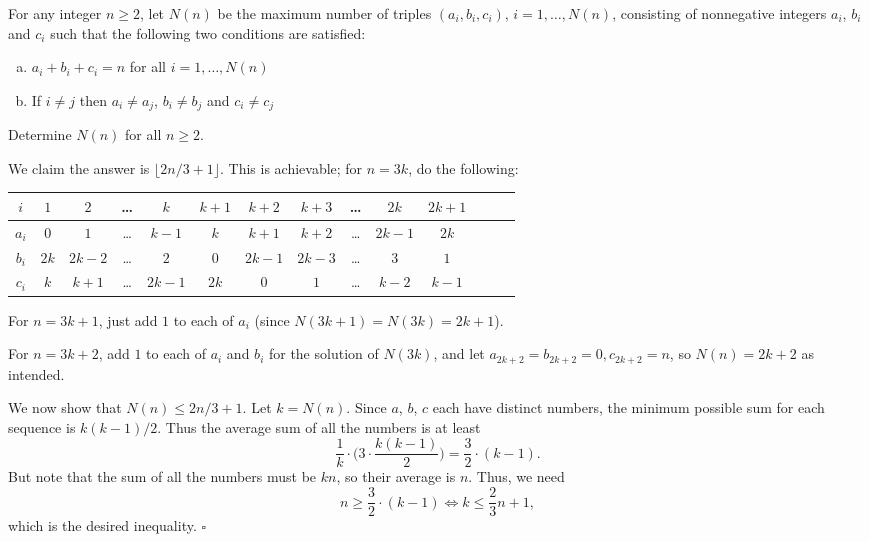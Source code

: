 
\begin{problem}[ISL 2009 C2]
    For any integer $n\geq 2$, let $N(n)$ be the maximum number of triples
    $(a_i, b_i, c_i)$, $i=1, \ldots, N(n)$, consisting of nonnegative integers
    $a_i$, $b_i$ and $c_i$ such that the following two conditions are satisfied: \begin{enumerate}[(a)]
        \item $a_i+b_i+c_i=n$ for all $i=1, \ldots, N(n)$
        \item If $i\neq j$ then $a_i\neq a_j$, $b_i\neq b_j$ and $c_i\neq c_j$
    \end{enumerate}
    Determine $N(n)$ for all $n\geq 2$.
\end{problem}

\begin{solution}
    We claim the answer is $\lfloor 2n/3 + 1 \rfloor$. This is achievable; for
    $n = 3k$, do the following:
    \begin{center}
    \begin{tabular}{c|c c c c c c c c c c c c c}
        $i$   & $1$ & $2$ & \ldots & $k$ & $k+1$ & $k+2$ & $k+3$ & \ldots & $2k$ & $2k+1$\\\hline
        $a_i$ & $0$ & $1$ & \ldots & $k-1$ & $k$ & $k+1$ & $k+2$ & \ldots & $2k-1$ & $2k$\\
        $b_i$ & $2k$ & $2k-2$ & \ldots & $2$ & $0$ & $2k-1$ & $2k-3$ & \ldots & $3$ & $1$\\
        $c_i$ & $k$ & $k+1$ & \ldots & $2k-1$ & $2k$ & $0$ & $1$ & \ldots & $k-2$ & $k-1$
    \end{tabular}
    \end{center}
    For $n = 3k+1$, just add $1$ to each of $a_i$ (since $N(3k+1) = N(3k) = 2k+1$).
    
    For $n = 3k+2$, add $1$ to each of $a_i$ and $b_i$ for the solution of $N(3k)$,
    and let $a_{2k+2} = b_{2k+2} = 0, c_{2k+2} = n$, so $N(n) = 2k+2$ as intended.
    
    We now show that $N(n) \leq 2n/3+1$. Let $k=N(n)$. Since $a$, $b$, $c$ each
    have distinct numbers, the minimum possible sum for each sequence is $k(k-1)/2$.
    Thus the average sum of all the numbers is at least
    \[\frac1k \cdot \bigg(3 \cdot \frac{k(k-1)}{2}\bigg) = \frac32 \cdot (k-1).\]
    But note that the sum of all the numbers must be $kn$, so their average is $n$.
    Thus, we need \[n \geq \frac32 \cdot (k-1) \Longleftrightarrow k \leq \frac23n+1,\]
    which is the desired inequality. $\square$
\end{solution}
